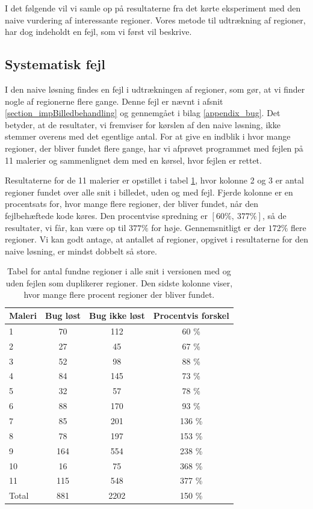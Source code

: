 {
{\sffamily I det følgende vil vi samle op på resultaterne fra det kørte
eksperiment med den naive vurdering af interessante regioner. Vores
metode til udtrækning af regioner, har dog indeholdt en fejl, som vi
først vil beskrive.
}

\subsection{Systematisk fejl\label{program_bug}}
I den naive løsning findes en fejl i udtrækningen af regioner, som gør,
at vi finder nogle af regionerne flere gange. Denne fejl er nævnt i
afsnit \ref{section_impBilledbehandling} og gennemgået i bilag
\ref{appendix_bug}. Det betyder, at de resultater, vi fremviser for
kørslen af den naive løsning, ikke stemmer overens med det egentlige
antal. For at give en indblik i hvor mange regioner, der bliver fundet
flere gange, har vi afprøvet programmet med fejlen på 11 malerier og
sammenlignet dem med en kørsel, hvor fejlen er rettet.

Resultaterne for de 11 malerier er opstillet i tabel \ref{bug_tabel},
hvor kolonne 2 og 3 er antal regioner fundet over alle snit i billedet,
uden og med fejl.  Fjerde kolonne er en procentsats for, hvor mange
flere regioner, der bliver fundet, når den fejlbehæftede kode køres. Den
procentvise spredning er $[60 \%,~377 \%]$, så de resultater, vi får,
kan være op til $377\%$ for høje.  Gennemsnitligt er der $172 \%$ flere
regioner. Vi kan godt antage, at antallet af regioner, opgivet i
resultaterne for den naive løsning, er mindst dobbelt så store.

\begin{table}[!h]
    \centering
    \begin{tabular}{|l|c|c|c|}
        \hline
  Maleri  & Bug løst 		& Bug ikke løst		& Procentvis forskel\\\hline
        1   & 70 			& 112 				& 60 \% \\
        2   & 27 			& 45 				& 67 \% \\
        3	& 52 			& 98 				& 88 \% \\
        4   & 84 			& 145 				& 73 \% \\
        5	& 32 			& 57 				& 78 \% \\
        6   & 88 			& 170 				& 93 \% \\
        7   & 85 			& 201 				& 136 \% \\
        8   & 78 			& 197 				& 153 \% \\
        9   & 164 			& 554 				& 238 \% \\
        10	& 16 			& 75 				& 368 \% \\
        11	& 115 			& 548 				& 377 \% \\\hline
	Total	& 881			& 2202				& 150 \% \\\hline
	  \end{tabular}
    \caption[]{Tabel for antal fundne regioner i alle snit i versionen
    med og uden fejlen som duplikerer regioner. Den sidste kolonne
    viser, hvor mange flere procent regioner der bliver fundet.}
    \label{bug_tabel}
\end{table}

}
